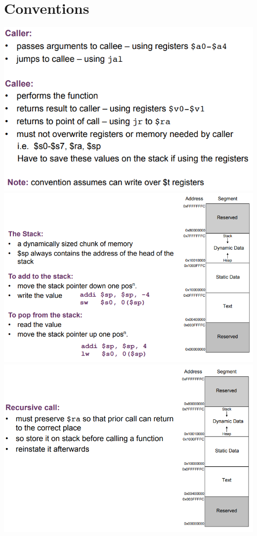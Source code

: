 \documentclass{article}[18pt]
\begin{document}
\section{Conventions}
\includegraphics[scale=0.7]{Conventions}\\
\includegraphics[scale=0.7]{Conventions1}\\
\includegraphics[scale=0.7]{Conventions2}\\
\end{document}
